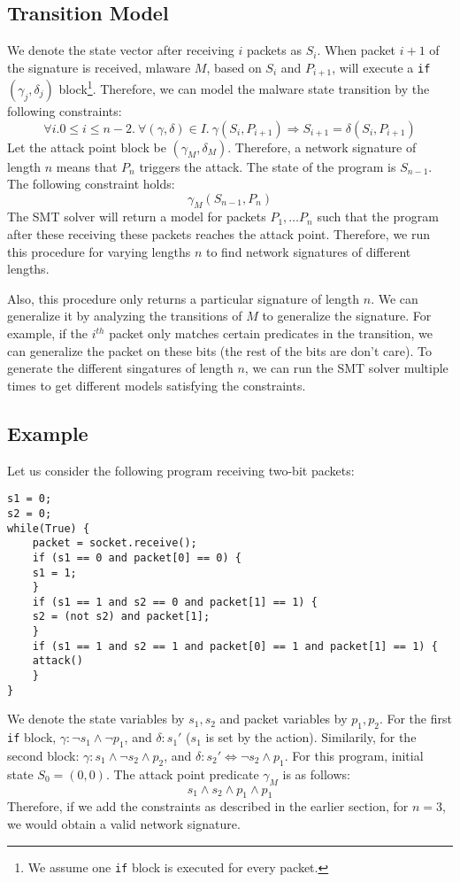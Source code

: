 \documentclass[]{article}
\begin{document}
\subsection{Transition Model}
We denote the state
vector after receiving $i$ packets as $S_i$.
When packet $i+1$ of the signature is received, 
mlaware $M$, based on $S_i$ and $P_{i+1}$, will execute 
a \texttt{if} $(\gamma_j, \delta_j)$ block\footnote{
	We assume one \texttt{if} block is executed for every packet.}.
Therefore, we can model the malware state transition 
by the following constraints: 
\begin{equation}
	\forall i. 0 \leq i \leq n-2.~\forall (\gamma, \delta) \in I. ~\gamma(S_i, P_{i+1}) \Rightarrow S_{i+1} = \delta(S_i, P_{i+1})
\end{equation}
Let the attack point block be $(\gamma_M, \delta_M)$. 
Therefore, a network signature of length $n$ means
that $P_n$ triggers the attack. The state of the program
is $S_{n-1}$. The following constraint holds:
\begin{equation}
	\gamma_M(S_{n-1},P_{n})
\end{equation}
The SMT solver will return a model for packets $P_1,
\ldots P_n$ such that the program after these receiving
these packets reaches the attack point. Therefore, 
we run this procedure for varying lengths $n$ to find
network signatures of different lengths.

Also, this procedure only returns a particular signature
of length $n$. We can generalize it by analyzing the 
transitions of $M$ to generalize the signature. For
example, if the $i^{th}$ packet only matches certain 
predicates in the transition, we can generalize the packet on
these bits (the rest of the bits are don't care). To 
generate the different singatures of length $n$, 
we can run the SMT solver multiple times to get different 
models satisfying the constraints.

\subsection{Example}
Let us consider the following program receiving two-bit packets:
\begin{lstlisting}	
s1 = 0;
s2 = 0;
while(True) {
	packet = socket.receive();
	if (s1 == 0 and packet[0] == 0) {
	s1 = 1;
	}
	if (s1 == 1 and s2 == 0 and packet[1] == 1) {
	s2 = (not s2) and packet[1];
	}
	if (s1 == 1 and s2 == 1 and packet[0] == 1 and packet[1] == 1) {
	attack()  
	}	
}
\end{lstlisting}	
We denote the state variables by $s_1, s_2$ and packet 
variables by $p_1, p_2$.
For the first \texttt{if} block, 
$\gamma: \neg s_1 \wedge \neg p_1$, and $\delta: s_1'$ ($s_1$ 
is set by the action). Similarily,
for the second block: 
$\gamma: s_1 \wedge \neg s_2 \wedge p_2$, and $\delta: 
s_2' \Leftrightarrow \neg s_2 \wedge p_1$.
For this program, initial state $S_0 = (0, 0)$.
The attack point predicate $\gamma_M$ is as follows:
\begin{equation}
	s_1 \wedge s_2 \wedge p_1 \wedge p_1
\end{equation}
Therefore, if we add the constraints as described in the 
earlier section, for $n=3$, we would obtain a
valid network signature. 

\end{document}
